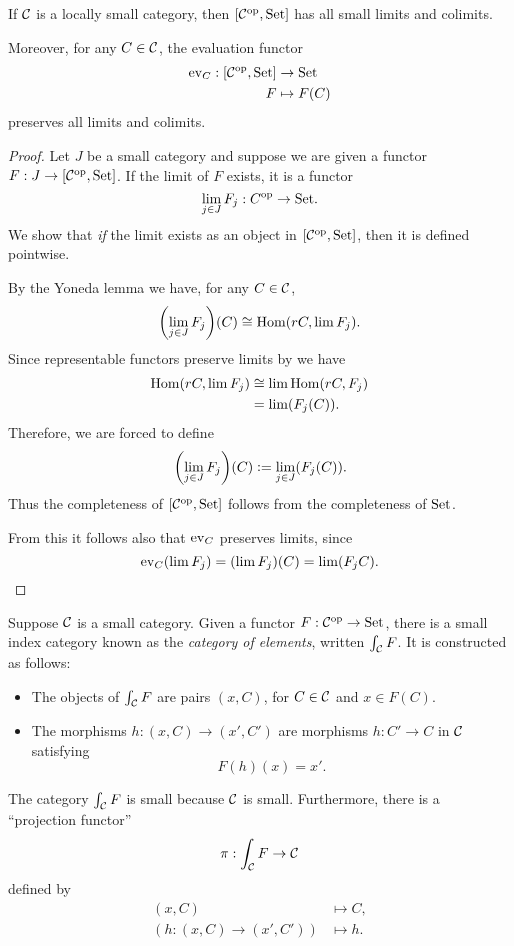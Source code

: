 \begin{proposition}
If $\mathcal{C}$ is a locally small category, then $[\mathcal{C}^{\mathrm{op}},\mathrm{Set}]$ has all small limits and colimits. 

Moreover, for any $C\in\mathcal{C}$, the evaluation functor 
\begin{align*}
\mathrm{ev}_C:[\mathcal{C}^{\mathrm{op}},\mathrm{Set}]&\to\mathrm{Set}\\
F&\mapsto F(C)
\end{align*}preserves all limits and colimits.
\end{proposition}

\begin{proof}
Let $J$ be a small category and suppose we are given a functor $F:J\to[\mathcal{C}^{\mathrm{op}},\mathrm{Set}]$. If the limit of $F$ exists, it is a functor
\[
\lim_{j\in J}F_j:C^{\mathrm{op}}\to\mathrm{Set}.
\]We show that \emph{if} the limit exists as an object in $[\mathcal{C}^{\mathrm{op}},\mathrm{Set}]$, then it is defined pointwise.

By the Yoneda lemma we have, for any $C\in\mathcal{C}$,
\[
\p*{\lim_{j\in J}F_j}(C)\cong\Hom(rC,\lim F_j).
\]Since representable functors preserve limits by  we have
\begin{align*}
\operatorname{Hom}(rC,\lim F_j)&\cong \lim\operatorname{Hom}(rC,F_j)\\
&=\lim (F_j(C)).
\end{align*} 
Therefore, we are forced to define
\[
\p*{\lim_{j\in J}F_j}(C)\defeq\lim_{j\in J}(F_j(C)).
\]Thus the completeness of $[\mathcal{C}^{\mathrm{op}},\mathrm{Set}]$ follows from the completeness of $\mathrm{Set}$.

From this it follows also that $\mathrm{ev}_C$ preserves limits, since
\[
\mathrm{ev}_C(\lim F_j)=(\lim F_j)(C)=\lim(F_jC).
\]
\end{proof}

\begin{example}\label{comma}
Suppose $\mathcal{C}$ is a small category. Given a functor $F:\mathcal{C}^{\mathrm{op}}\to\mathrm{Set}$, there is a small index category known as the \emph{category of elements}, written $\int_{\mathcal{C}} F$. It is constructed as follows:
\begin{itemize}
\item The objects of $\int_{\mathcal{C}} F$ are pairs $(x,C)$, for $C\in\mathcal{C}$ and $x\in F(C)$.
\item The morphisms $h:(x,C)\to(x',C')$ are morphisms $h:C'\to C$ in $\mathcal{C}$ satisfying \[F(h)(x)=x'.\]
\end{itemize}
The category $\int_{\mathcal{C}} F$ is small because $\mathcal{C}$ is small. Furthermore, there is a ``projection functor''
\[
\pi:\int_{\mathcal{C}} F\to \mathcal{C}
\]defined by
\begin{align*}
(x,C)&\mapsto C,\\
(h:(x,C)\to(x',C'))&\mapsto h.
\end{align*}

\end{example}

